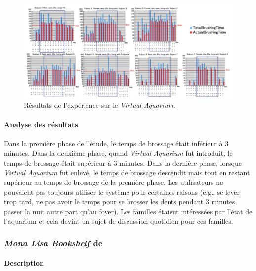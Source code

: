 \documentclass[10pt,a5paper,twoside]{article}
\begin{document}
\begin{figure}
\centering
\includegraphics[width=0.900\hsize]{images/virtualaquarium-screenshot5.png}
\caption{Résultats de l'expérience sur le \emph{Virtual
Aquarium}.}\label{fig:virtualaquarium5}
\end{figure}

\paragraph{Analyse des résultats}\label{analyse-des-ruxe9sultats}

Dans la première phase de l'étude, le temps de brossage était inférieur
à 3 minutes. Dans la deuxième phase, quand \emph{Virtual Aquarium} fut
introduit, le temps de brossage était supérieur à 3 minutes. Dans la
dernière phase, lorsque \emph{Virtual Aquarium} fut enlevé, le temps de
brossage descendit mais tout en restant supérieur au temps de brossage
de la première phase. Les utilisateurs ne pouvaient pas toujours
utiliser le système pour certaines raisons (e.g., se lever trop tard, ne
pas avoir le temps pour se brosser les dents pendant 3 minutes, passer
la nuit autre part qu'au foyer). Les familles étaient intéressées par
l'état de l'aquarium et cela devint un sujet de discussion quotidien
pour ces familles.

\subsubsection{\emph{Mona Lisa Bookshelf} de
\citet{nakajima2008reflecting}}\label{mona-lisa-bookshelf-de-nakajima2008reflecting}

\paragraph{Description}\label{description-1}
\end{document}
